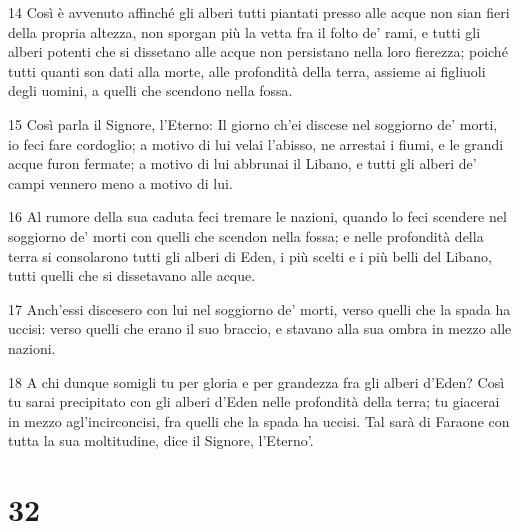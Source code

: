 \par 14 Così è avvenuto affinché gli alberi tutti piantati presso alle acque non sian fieri della propria altezza, non sporgan più la vetta fra il folto de' rami, e tutti gli alberi potenti che si dissetano alle acque non persistano nella loro fierezza; poiché tutti quanti son dati alla morte, alle profondità della terra, assieme ai figliuoli degli uomini, a quelli che scendono nella fossa.
\par 15 Così parla il Signore, l'Eterno: Il giorno ch'ei discese nel soggiorno de' morti, io feci fare cordoglio; a motivo di lui velai l'abisso, ne arrestai i fiumi, e le grandi acque furon fermate; a motivo di lui abbrunai il Libano, e tutti gli alberi de' campi vennero meno a motivo di lui.
\par 16 Al rumore della sua caduta feci tremare le nazioni, quando lo feci scendere nel soggiorno de' morti con quelli che scendon nella fossa; e nelle profondità della terra si consolarono tutti gli alberi di Eden, i più scelti e i più belli del Libano, tutti quelli che si dissetavano alle acque.
\par 17 Anch'essi discesero con lui nel soggiorno de' morti, verso quelli che la spada ha uccisi: verso quelli che erano il suo braccio, e stavano alla sua ombra in mezzo alle nazioni.
\par 18 A chi dunque somigli tu per gloria e per grandezza fra gli alberi d'Eden? Così tu sarai precipitato con gli alberi d'Eden nelle profondità della terra; tu giacerai in mezzo agl'incirconcisi, fra quelli che la spada ha uccisi. Tal sarà di Faraone con tutta la sua moltitudine, dice il Signore, l'Eterno'.

\chapter{32}

